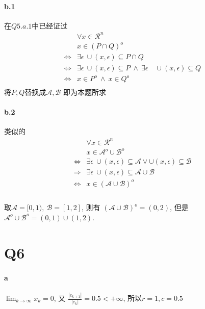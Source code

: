 \documentclass{article}
\begin{document}
\begin{CJK}{UTF8}{gbsn}
  \paragraph{b.1}
    在$Q5.a.1$中已经证过
    \begin{equation}
      \begin{aligned}
        & \forall x \in \mathcal{R}^n \\
        & x \in (P \cap Q)^o \\
        \iff & \exists \epsilon \ \cup (x, \epsilon) \subseteq P \cap Q \\
        \iff & \exists \epsilon \ \cup (x, \epsilon) \subseteq P \ \land\  \exists \epsilon \quad \cup (x, \epsilon) \subseteq Q \\
        \iff & x \in P^o \ \land\  x \in Q^o \\
      \end{aligned}
    \end{equation}
    将$P,Q$替换成$\mathcal{A}, \mathcal{B}$ 即为本题所求
  \paragraph{b.2}
    类似的
    \begin{equation}
      \begin{aligned}
        & \forall x \in \mathcal{R}^n \\
        & x \in \mathcal{A}^o \cup \mathcal{B}^o \\
        \iff & \exists \epsilon \ \cup (x, \epsilon) \subseteq \mathcal{A} \lor \cup (x, \epsilon) \subseteq \mathcal{B} \\
        \Longrightarrow & \exists \epsilon \ \cup (x, \epsilon) \subseteq \mathcal{A} \cup \mathcal{B} \\
        \iff & x \in (\mathcal{A} \cup \mathcal{B})^o \\
      \end{aligned}
    \end{equation}
    \paragraph{}
      取$\mathcal{A} = [0, 1),\ \mathcal{B} = [1, 2]$, 则有 $(\mathcal{A} \cup \mathcal{B})^o = (0, 2)$, 但是 $\mathcal{A}^o \cup \mathcal{B}^o = (0, 1) \cup (1, 2)$.
\section{Q6}
  \paragraph{a}
    $\lim_{k \to \infty} x_k = 0$, 又 $\frac{|e_{k + 1}|}{|e_k|} = 0.5 < +\infty$, 所以$r = 1, c = 0.5$

\end{CJK}
\end{document}
